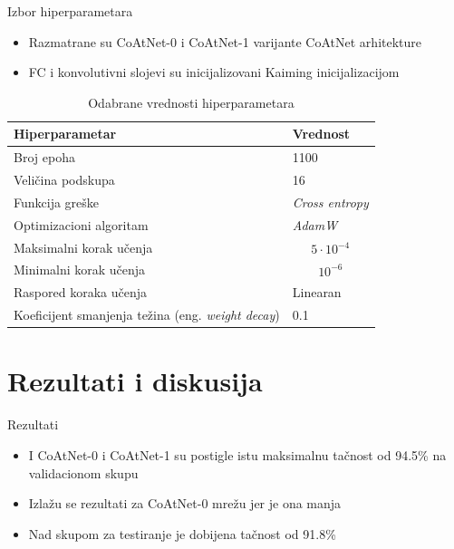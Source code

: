 \documentclass{beamer}
\begin{document}
\begin{frame}{Izbor hiperparametara}
    \begin{itemize}
        \item Razmatrane su CoAtNet-0 i CoAtNet-1 varijante CoAtNet arhitekture
        \item FC i konvolutivni slojevi su inicijalizovani Kaiming inicijalizacijom
    \end{itemize}
    \begin{center}
        \begin{table}[h]
            \begin{tabular}{ l l } 
                 \hline
                 Hiperparametar & Vrednost \\
                 \hline
                 Broj epoha & 1100 \\
                 Veličina podskupa & 16 \\
                 Funkcija greške & \textit{Cross entropy} \\
                 Optimizacioni algoritam & \textit{AdamW} \\
                 Maksimalni korak učenja & $$5 \cdot 10^{-4}$$ \\
                 Minimalni korak učenja & $$10^{-6}$$ \\
                 Raspored koraka učenja & Linearan \\
                 Koeficijent smanjenja težina (eng. \textit{weight decay}) & 0.1 \\
                 \hline
            \end{tabular}
            \caption{Odabrane vrednosti hiperparametara}
            \label{tab:abc}
        \end{table}
    \end{center}
\end{frame}
\section{Rezultati i diskusija}
\begin{frame}{Rezultati}
    \begin{itemize}
        \item I CoAtNet-0 i CoAtNet-1 su postigle istu maksimalnu tačnost od 94.5\% na validacionom skupu 
        \item Izlažu se rezultati za CoAtNet-0 mrežu jer je ona manja
        \item Nad skupom za testiranje je dobijena tačnost od 91.8\%
    \end{itemize}
\end{frame}
\end{document}

